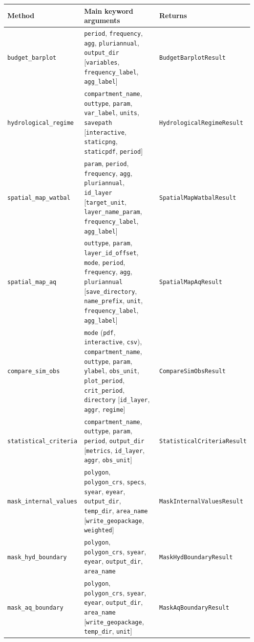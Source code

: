 \documentclass[11pt]{article}
\begin{document}
\begin{center}
\begin{tabularx}{\textwidth}{l X l}
\toprule
\textbf{Method} & \textbf{Main keyword arguments} & \textbf{Returns} \\
\midrule
\texttt{budget\_barplot} & \texttt{period}, \texttt{frequency}, \texttt{agg}, \texttt{pluriannual}, \texttt{output\_dir} [\texttt{variables}, \texttt{frequency\_label}, \texttt{agg\_label}] & \texttt{BudgetBarplotResult} \\
\texttt{hydrological\_regime} & \texttt{compartment\_name}, \texttt{outtype}, \texttt{param}, \texttt{var\_label}, \texttt{units}, \texttt{savepath} [\texttt{interactive}, \texttt{staticpng}, \texttt{staticpdf}, \texttt{period}] & \texttt{HydrologicalRegimeResult} \\
\texttt{spatial\_map\_watbal} & \texttt{param}, \texttt{period}, \texttt{frequency}, \texttt{agg}, \texttt{pluriannual}, \texttt{id\_layer} [\texttt{target\_unit}, \texttt{layer\_name\_param}, \texttt{frequency\_label}, \texttt{agg\_label}] & \texttt{SpatialMapWatbalResult} \\
\texttt{spatial\_map\_aq} & \texttt{outtype}, \texttt{param}, \texttt{layer\_id\_offset}, \texttt{mode}, \texttt{period}, \texttt{frequency}, \texttt{agg}, \texttt{pluriannual} [\texttt{save\_directory}, \texttt{name\_prefix}, \texttt{unit}, \texttt{frequency\_label}, \texttt{agg\_label}] & \texttt{SpatialMapAqResult} \\
\texttt{compare\_sim\_obs} & \texttt{mode} (\texttt{pdf}, \texttt{interactive}, \texttt{csv}), \texttt{compartment\_name}, \texttt{outtype}, \texttt{param}, \texttt{ylabel}, \texttt{obs\_unit}, \texttt{plot\_period}, \texttt{crit\_period}, \texttt{directory} [\texttt{id\_layer}, \texttt{aggr}, \texttt{regime}] & \texttt{CompareSimObsResult} \\
\texttt{statistical\_criteria} & \texttt{compartment\_name}, \texttt{outtype}, \texttt{param}, \texttt{period}, \texttt{output\_dir} [\texttt{metrics}, \texttt{id\_layer}, \texttt{aggr}, \texttt{obs\_unit}] & \texttt{StatisticalCriteriaResult} \\
\texttt{mask\_internal\_values} & \texttt{polygon}, \texttt{polygon\_crs}, \texttt{specs}, \texttt{syear}, \texttt{eyear}, \texttt{output\_dir}, \texttt{temp\_dir}, \texttt{area\_name} [\texttt{write\_geopackage}, \texttt{weighted}] & \texttt{MaskInternalValuesResult} \\
\texttt{mask\_hyd\_boundary} & \texttt{polygon}, \texttt{polygon\_crs}, \texttt{syear}, \texttt{eyear}, \texttt{output\_dir}, \texttt{area\_name} & \texttt{MaskHydBoundaryResult} \\
\texttt{mask\_aq\_boundary} & \texttt{polygon}, \texttt{polygon\_crs}, \texttt{syear}, \texttt{eyear}, \texttt{output\_dir}, \texttt{area\_name} [\texttt{write\_geopackage}, \texttt{temp\_dir}, \texttt{unit}] & \texttt{MaskAqBoundaryResult} \\
\bottomrule
\end{tabularx}
\end{center}
\end{document}
